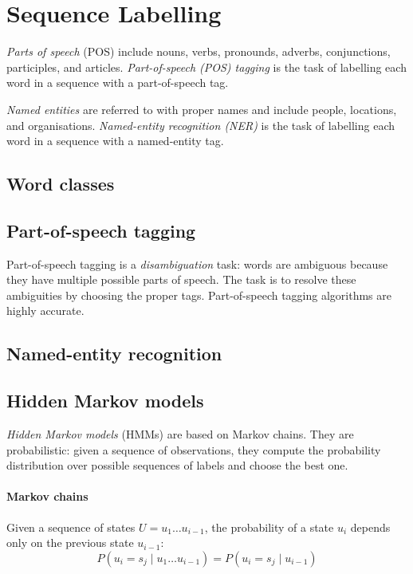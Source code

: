 \section{Sequence Labelling}
\label{sec:8:sequence-labelling}

\textit{Parts of speech} (POS) include nouns, verbs, pronounds, adverbs,
conjunctions, participles, and articles.
\textit{Part-of-speech (POS) tagging} is the task of labelling each word in a
sequence with a part-of-speech tag.

\textit{Named entities} are referred to with proper names and include people,
locations, and organisations.
\textit{Named-entity recognition (NER)} is the task of labelling each word in a
sequence with a named-entity tag.

\subsection{Word classes}

\subsection{Part-of-speech tagging}

Part-of-speech tagging is a \textit{disambiguation} task: words are ambiguous
because they have multiple possible parts of speech.
The task is to resolve these ambiguities by choosing the proper tags.
Part-of-speech tagging algorithms are highly accurate.

\subsection{Named-entity recognition}

\subsection{Hidden Markov models}

\textit{Hidden Markov models} (HMMs) are based on Markov chains.
They are probabilistic: given a sequence of observations, they compute the
probability distribution over possible sequences of labels and choose the best
one.

\paragraph{Markov chains}

\begin{dfn}
  \label{dfn:8:markov-assumption}
  Given a sequence of states $U = u_1 \dots u_{i - 1}$, the probability of a
  state $u_i$ depends only on the previous state $u_{i - 1}$:
  \begin{equation}
    P(u_i = s_j \mid u_1 \dots u_{i - 1}) = P(u_i = s_j \mid u_{i - 1})
  \end{equation}
\end{dfn}

